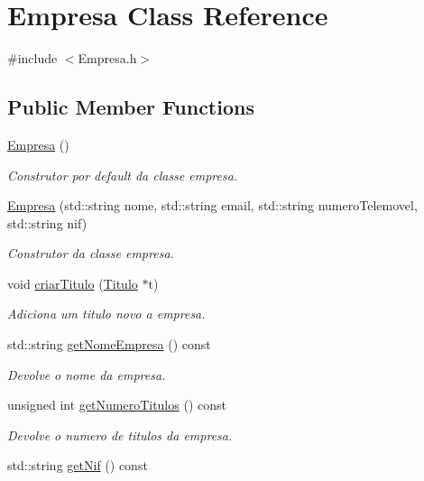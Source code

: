 \hypertarget{classEmpresa}{}\section{Empresa Class Reference}
\label{classEmpresa}


{\ttfamily \#include $<$Empresa.\+h$>$}

\subsection*{Public Member Functions}
\begin{DoxyCompactItemize}
\item 
\hyperlink{classEmpresa_aff124b958356c479ab50ddf4cf302193}{Empresa} ()
\begin{DoxyCompactList}\small\item\em Construtor por default da classe empresa. \end{DoxyCompactList}\item 
\hyperlink{classEmpresa_a19748f9e5c99292e3cd1489712751271}{Empresa} (std\+::string nome, std\+::string email, std\+::string numero\+Telemovel, std\+::string nif)
\begin{DoxyCompactList}\small\item\em Construtor da classe empresa. \end{DoxyCompactList}\item 
void \hyperlink{classEmpresa_a3c6eb96c694dcb6db1e402d6db1c439a}{criar\+Titulo} (\hyperlink{classTitulo}{Titulo} $\ast$t)
\begin{DoxyCompactList}\small\item\em Adiciona um titulo novo a empresa. \end{DoxyCompactList}\item 
std\+::string \hyperlink{classEmpresa_a99bc2de98a0c0348abb74c93e6e7159e}{get\+Nome\+Empresa} () const
\begin{DoxyCompactList}\small\item\em Devolve o nome da empresa. \end{DoxyCompactList}\item 
unsigned int \hyperlink{classEmpresa_a49b2b94a54bbc341822f64fc194f98fd}{get\+Numero\+Titulos} () const
\begin{DoxyCompactList}\small\item\em Devolve o numero de titulos da empresa. \end{DoxyCompactList}\item 
std\+::string \hyperlink{classEmpresa_a6ab12452496ccaea5493bd2c67824f09}{get\+Nif} () const

\end{DoxyCompactItemize}
